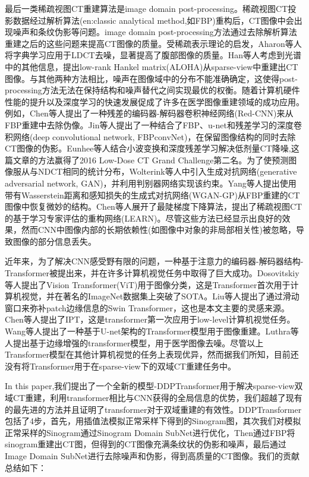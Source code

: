 最后一类稀疏视图CT重建算法是image domain post-processing。稀疏视图CT投影数据经过解析算法(en:classic analytical method,如FBP)重构后，CT图像中会出现噪声和条纹伪影等问题。image domain post-processing方法通过去除解析算法重建之后的这些问题来提高CT图像的质量。受稀疏表示理论的启发，Aharon等人将字典学习\cite{2006ksvd}应用于LDCT去噪，显著提高了腹部图像的质量。Han\cite{2016Sparse}等人考虑到光谱中的其他信息，提出low-rank Hankel matrix(ALOHA)从sparse-view中重建出CT图像。与其他两种方法相比，噪声在图像域中的分布不能准确确定，这使得post-processing方法无法在保持结构和噪声替代之间实现最优的权衡。随着计算机硬件性能的提升以及深度学习的快速发展促成了许多在医学图像重建领域的成功应用。例如，Chen等人\cite{redcnn}提出了一种残差的编码器-解码器卷积神经网络(Red-CNN)来从FBP重建中去除伪像。Jin等人\cite{2016FBPConvNet}提出了一种结合了FBP、u-net和残差学习的深度卷积网络(deep convolutional network, FBPconvNet)，在保留图像结构的同时去除CT图像的伪影。Eunhee等人\cite{8332971}结合小波变换和深度残差学习解决低剂量CT降噪,这篇文章的方法赢得了2016 Low-Dose CT Grand Challenge第二名。为了使预测图像服从与NDCT相同的统计分布，Wolterink等人\cite{2017Generative}中引入生成对抗网络(generative adversarial network, GAN)，并利用判别器网络实现该约束。Yang等人\cite{2018Low}提出使用带有Wasserstein距离和感知损失的生成式对抗网络(WGAN-GP)从FBP重建的CT图像中恢复微妙的结构。Chen等人\cite{2018LEARN}展开了最陡梯度下降算法，提出了稀疏视图CT的基于学习专家评估的重构网络(LEARN)。尽管这些方法已经显示出良好的效果，然而CNN中图像内部的长期依赖性(如图像中对象的非局部相关性)被忽略，导致图像的部分信息丢失。\par

近年来，为了解决CNN感受野有限的问题，一种基于注意力的编码器-解码器结构-Transformer\cite{vaswani2017attention}被提出来，并在许多计算机视觉任务中取得了巨大成功。Dosovitskiy等人\cite{dosovitskiy2020vit}提出了Vision Transformer(ViT)用于图像分类，这是Transformer首次用于计算机视觉，并在著名的ImageNet数据集\cite{2009ImageNet}上突破了SOTA。Liu等人\cite{liu2021Swin}提出了通过滑动窗口来弥补patch边缘信息的Swin Transformer，这也是本文主要的灵感来源。Chen等人提出了IPT\cite{chen2021pre}，这是transformer第一次应用于low-level计算机视觉任务。Wang等人提出了一种基于U-net架构的Transformer模型\cite{wang2021uformer}用于图像重建。Luthra等人\cite{2021Eformer}提出基于边缘增强的transformer模型，用于医学图像去噪。尽管以上Transformer模型在其他计算机视觉的任务上表现优异，然而据我们所知，目前还没有将Transformer用于在sparse-view下的双域CT重建任务中。\par

In this paper,我们提出了一个全新的模型-DDPTransformer用于解决sparse-view双域CT重建，利用transformer相比与CNN获得的全局信息的优势，我们超越了现有的最先进的方法并且证明了transformer对于双域重建的有效性。DDPTransformer包括了4步，首先，用插值法模拟正常采样下得到的Sinogram图，其次我们对模拟正常采样的Sinogram通过Sinogram Domain SubNet进行优化，Then通过FBP将sinogram重建出CT图，但得到的CT图像充满条纹状的伪影和噪声，最后通过Image Domain SubNet进行去除噪声和伪影，得到高质量的CT图像。我们的贡献总结如下：

